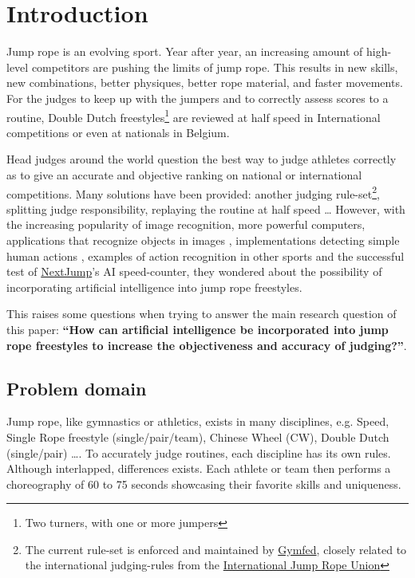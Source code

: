 
\section{Introduction}
\label{sec:introduction}

Jump rope is an evolving sport.
Year after year, an increasing amount of high-level competitors are pushing the limits of jump rope.
This results in new skills, new combinations, better physiques, better rope material, and faster movements. For the judges to keep up with the jumpers and to correctly assess scores to a routine, Double Dutch freestyles\footnote{Two turners, with one or more jumpers} are reviewed at half speed in International competitions or even at nationals in Belgium.

Head judges around the world question the best way to judge athletes correctly as to give an accurate and objective ranking on national or international competitions.
Many solutions have been provided: another judging rule-set\footnote{The current rule-set is enforced and maintained by \href{https://www.gymfed.be/}{Gymfed}, closely related to the international judging-rules from the \href{https://ijru.sport/}{International Jump Rope Union}}, splitting judge responsibility, replaying the routine at half speed \dots
However, with the increasing popularity of image recognition, more powerful computers, applications that recognize objects in images \autocite{Singh_Gill_2022}, implementations detecting simple human actions \autocite{LUQMAN_2022}, examples of action recognition in other sports \autocite{Yin_2024} and the successful test of \href{https://nextjump.app/}{NextJump}'s AI speed-counter, they wondered about the possibility of incorporating artificial intelligence into jump rope freestyles.

This raises some questions when trying to answer the main research question of this paper: \textbf{``How can artificial intelligence be incorporated into jump rope freestyles to increase the objectiveness and accuracy of judging?''}.

\subsection{Problem domain}
\label{subsec:intro-problem-domain}

Jump rope, like gymnastics or athletics, exists in many disciplines, e.g. Speed, Single Rope freestyle (single/pair/team), Chinese Wheel (CW), Double Dutch (single/pair) \dots. To accurately judge routines, each discipline has its own rules. Although interlapped, differences exists. Each athlete or team then performs a choreography of 60 to 75 seconds showcasing their favorite skills and uniqueness.


